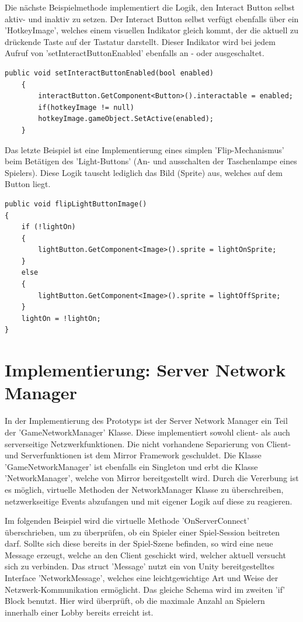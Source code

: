 Die nächste Beispielmethode implementiert die Logik, den Interact Button selbst aktiv- und inaktiv zu setzen. Der Interact Button selbst verfügt ebenfalls über ein 'HotkeyImage', welches einem visuellen Indikator gleich kommt, der die aktuell zu drückende Taste auf der Tastatur darstellt. Dieser Indikator wird bei jedem Aufruf von 'setInteractButtonEnabled' ebenfalls an - oder ausgeschaltet.

\begin{lstlisting}[caption= InGameUiControllerScript.cs setInteractButtonEnabled]
public void setInteractButtonEnabled(bool enabled)
	{
		interactButton.GetComponent<Button>().interactable = enabled;
		if(hotkeyImage != null)
		hotkeyImage.gameObject.SetActive(enabled);
	}
\end{lstlisting}

Das letzte Beispiel ist eine Implementierung eines simplen 'Flip-Mechanismus' beim Betätigen des 'Light-Buttons' (An- und ausschalten der Taschenlampe eines Spielers). Diese Logik tauscht lediglich das Bild (Sprite) aus, welches auf dem Button liegt.

\begin{lstlisting}[caption= InGameUiControllerScript.cs flipLightButtonImage]
public void flipLightButtonImage()
{
	if (!lightOn)
	{
		lightButton.GetComponent<Image>().sprite = lightOnSprite;
	}
	else
	{
		lightButton.GetComponent<Image>().sprite = lightOffSprite;
	}
	lightOn = !lightOn;
}
\end{lstlisting}


\section{Implementierung: Server Network Manager}

In der Implementierung des Prototyps ist der Server Network Manager ein Teil der 'GameNetworkManager' Klasse. Diese implementiert sowohl client- als auch serverseitige Netzwerkfunktionen. Die nicht vorhandene Separierung von Client- und Serverfunktionen ist dem Mirror Framework geschuldet. Die Klasse 'GameNetworkManager' ist ebenfalls ein Singleton und erbt die Klasse 'NetworkManager', welche von Mirror bereitgestellt wird. Durch die Vererbung ist es möglich, virtuelle Methoden\cite{Billwagner.08.02.2022} der NetworkManager Klasse zu überschreiben, netzwerkseitige Events abzufangen und mit eigener Logik auf diese zu reagieren. 

Im folgenden Beispiel wird die virtuelle Methode 'OnServerConnect' überschrieben, um zu überprüfen, ob ein Spieler einer Spiel-Session beitreten darf. Sollte sich diese bereits in der Spiel-Szene befinden, so wird eine neue Message erzeugt, welche an den Client geschickt wird, welcher aktuell versucht sich zu verbinden. Das struct 'Message' nutzt ein von Unity bereitgestelltes Interface 'NetworkMessage', welches eine leichtgewichtige Art und Weise der Netzwerk-Kommunikation ermöglicht. Das gleiche Schema wird im zweiten 'if' Block benutzt. Hier wird überprüft, ob die maximale Anzahl an Spielern innerhalb einer Lobby bereits erreicht ist.

